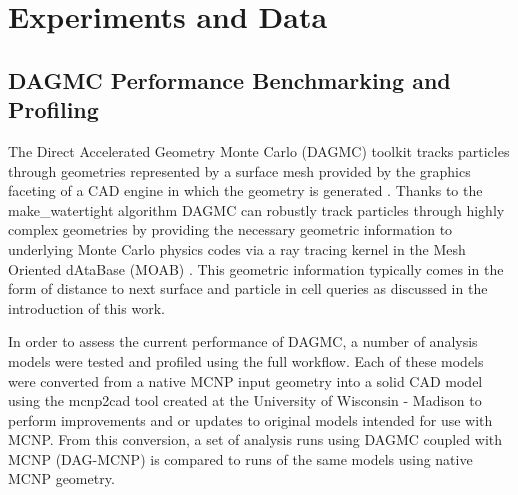 \documentclass[12pt, a4paper]{article}
\begin{document}


\newpage

\section{Experiments and Data}%
\label{experiments_and_data}

\subsection{DAGMC Performance Benchmarking and Profiling}%
\label{perf_benchmark}

The Direct Accelerated Geometry Monte Carlo (DAGMC) toolkit tracks particles through geometries represented by a surface mesh provided by the graphics faceting of a CAD engine in which the geometry is generated \cite{Tautges_2009}. Thanks to the make\_watertight algorithm \cite{Smith_2010} DAGMC can robustly track particles through highly complex geometries by providing the necessary geometric information to underlying Monte Carlo physics codes via a ray tracing kernel in the Mesh Oriented dAtaBase (MOAB) \cite{Tautges_2004}. This geometric information typically comes in the form of distance to next surface and particle in cell queries as discussed in the introduction of this work.

In order to assess the current performance of DAGMC, a number of analysis models were tested and profiled using the full workflow. Each of these models were converted from a native MCNP input geometry into a solid CAD model using the mcnp2cad \cite{mcnp2cad} tool created at the University of Wisconsin - Madison to perform improvements and or updates to original models intended for use with MCNP. From this conversion, a set of analysis runs using DAGMC coupled with MCNP (DAG-MCNP) is compared to runs of the same models using native MCNP geometry.
\end{document}
